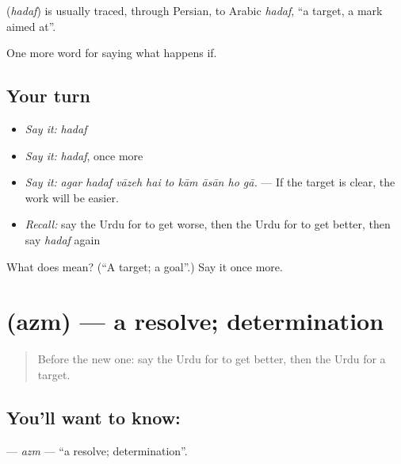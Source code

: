 \begin{cousinweb}
\textbf{} (\emph{hadaf}) is usually traced, through Persian, to Arabic \emph{hadaf}, \textquotedblleft{}a target, a mark aimed at\textquotedblright{}.
\end{cousinweb}

\begin{grammarlens}[title={What you've built}]
One more word for saying what happens if.
\end{grammarlens}

\subsection*{Your turn}
\begin{itemize}
\raggedright
  \item \emph{Say it:} \emph{hadaf}
  \item \emph{Say it:} \emph{hadaf}, once more
  \item \emph{Say it:} \emph{agar hadaf vāzeh hai to kām āsān ho gā.} — If the target is clear, the work will be easier.
  \item \emph{Recall:} say the Urdu for to get worse, then the Urdu for to get better, then say \emph{hadaf} again
\end{itemize}

\begin{tcolorbox}[breakable,colback=teal!4,colframe=teal!35!black,title={Before you move on}]
What does  mean? (\textquotedblleft{}A target; a goal\textquotedblright{}.) Say it once more.
\end{tcolorbox}
\section[\texorpdfstring{\ur{عزم} (azm)}{عزم (azm)}]{ (azm) — a resolve; determination}

\label{lesson:UR-C378-azm}



\begin{quote}
Before the new one: say the Urdu for to get better, then the Urdu for a target.
\end{quote}

\subsection*{You'll want to know: }
\textbf{} — \emph{azm} — \textquotedblleft{}a resolve; determination\textquotedblright{}.

